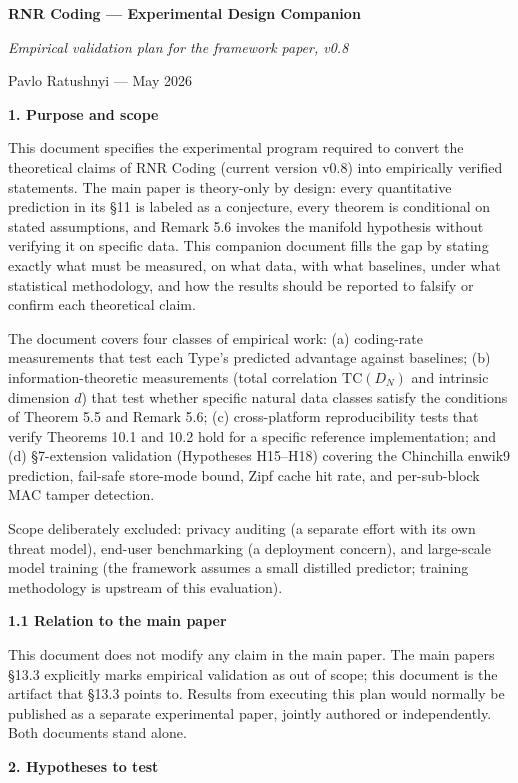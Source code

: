\documentclass[
]{article}
\author{}
\date{}
\begin{document}
\textbf{RNR Coding --- Experimental Design Companion}

\emph{Empirical validation plan for the framework paper, v0.8}

Pavlo Ratushnyi --- May 2026

\textbf{1. Purpose and scope}

This document specifies the experimental program required to convert
the theoretical claims of RNR Coding (current version v0.8) into
empirically verified statements. The main paper is theory-only by design: every quantitative
prediction in its §11 is labeled as a conjecture, every theorem is
conditional on stated assumptions, and Remark 5.6 invokes the manifold
hypothesis without verifying it on specific data. This companion
document fills the gap by stating exactly what must be measured, on what
data, with what baselines, under what statistical methodology, and how
the results should be reported to falsify or confirm each theoretical
claim.

The document covers four classes of empirical work: (a) coding-rate
measurements that test each Type's predicted advantage against
baselines; (b) information-theoretic measurements (total correlation
$\mathrm{TC}(D_N)$ and intrinsic dimension $d$) that test whether
specific natural data classes satisfy the conditions of Theorem 5.5
and Remark 5.6; (c) cross-platform reproducibility tests that
verify Theorems 10.1 and 10.2 hold for a specific reference
implementation; and (d) §7-extension validation (Hypotheses H15--H18)
covering the Chinchilla enwik9 prediction, fail-safe store-mode bound,
Zipf cache hit rate, and per-sub-block MAC tamper detection.

Scope deliberately excluded: privacy auditing (a separate effort with
its own threat model), end-user benchmarking (a deployment concern), and
large-scale model training (the framework assumes a small distilled
predictor; training methodology is upstream of this evaluation).

\textbf{1.1 Relation to the main paper}

This document does not modify any claim in the main paper. The main
paper\textquotesingle s §13.3 explicitly marks empirical validation as
out of scope; this document is the artifact that §13.3 points to.
Results from executing this plan would normally be published as a
separate experimental paper, jointly authored or independently. Both
documents stand alone.

\textbf{2. Hypotheses to test}
\end{document}
